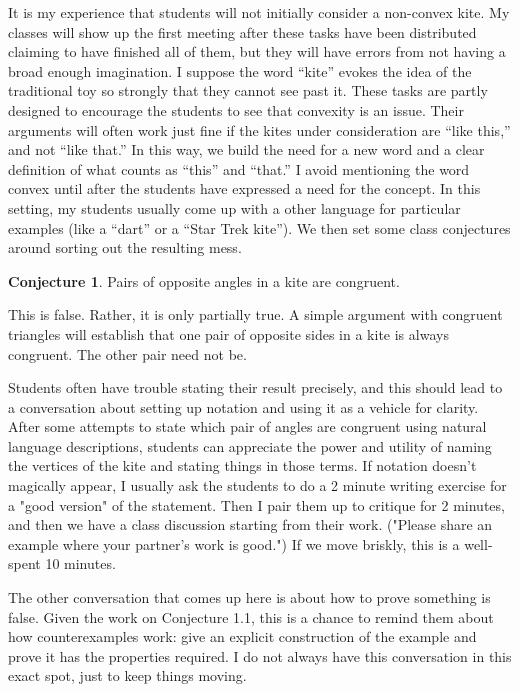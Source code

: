 \documentclass{tufte-handout}
\theoremstyle{definition}
\newtheorem{conjecture}[problem]{Conjecture}
\begin{document}
It is my experience that students will not initially consider a non-convex kite. My classes will show up the first meeting after these tasks have been distributed claiming to have finished all of them, but they will have errors from not having a broad enough imagination. I suppose the word ``kite'' 
evokes the idea of the traditional toy so strongly that they cannot see past it.
These tasks are partly designed to encourage the students to see that convexity is an issue.
Their arguments will often work just fine if the kites under consideration are ``like this,'' and not ``like that.'' In this way, we build the need for a new word and a clear definition of what counts as ``this'' and ``that.''
I avoid mentioning the word convex until after the students have expressed a need for the concept. In this setting, my students usually come up with a other language for particular examples (like a ``dart'' or a ``Star Trek kite''). We then set some class conjectures around sorting out the resulting mess.

\begin{conjecture}
\label{conj:kite-opp-angles}
Pairs of opposite angles in a kite are congruent.
\end{conjecture}

This is false. Rather, it is only partially true. A simple argument with congruent triangles will establish that one pair of opposite sides in a kite is always congruent. The other pair need not be. 

Students often have trouble stating their result precisely, and this should lead to a conversation about setting up notation and using it as a vehicle for clarity. After some attempts to state which pair of angles are congruent using natural language descriptions, students can appreciate the power and utility of naming the vertices of the kite and stating things in those terms. If notation doesn't magically appear, I usually ask the students to do a 2 minute writing exercise for a "good version" of the statement. Then I pair them up to critique for 2 minutes, and then we have a class discussion starting from their work. ("Please share an example where your partner's work is good.") If we move briskly, this is a well-spent 10 minutes.

The other conversation that comes up here is about how to prove something is false. Given the work on Conjecture 1.1, this is a chance to remind them about how counterexamples work: give an explicit construction of the example and prove it has the properties required. I do not always have this conversation in this exact spot, just to keep things moving.
\end{document}
